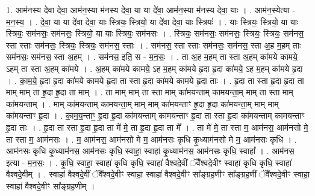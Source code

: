 \documentclass[17pt]{extarticle}
\begin{document}
1. आम॑नस्य देवा देवा॒ आम॑न॒स्या म॑नस्य देवा॒ या या दे॑वा॒ आम॑न॒स्या म॑नस्य देवा॒ याः । . आम॑न॒स्येत्या - म॒न॒स्य॒ । . दे॒वा॒ या या दे॑वा देवा॒ याः स्त्रियः॒ स्त्रियो॒ या दे॑वा देवा॒ याः स्त्रियः॑ । . याः स्त्रियः॒ स्त्रियो॒ या याः स्त्रियः॒ सम॑नसः॒ सम॑नसः॒ स्त्रियो॒ या याः स्त्रियः॒ सम॑नसः । . स्त्रियः॒ सम॑नसः॒ सम॑नसः॒ स्त्रियः॒ स्त्रियः॒ सम॑नस॒ स्ता स्ताः सम॑नसः॒ स्त्रियः॒ स्त्रियः॒ सम॑नस॒ स्ताः । . सम॑नस॒ स्ता स्ताः सम॑नसः॒ सम॑नस॒ स्ता अ॒ह म॒हम् ताः सम॑नसः॒ सम॑नस॒ स्ता अ॒हम् । . सम॑नस॒ इति॒ स - म॒न॒सः॒ । . ता अ॒ह म॒हम् ता स्ता अ॒हम् का॑मये कामये॒ ऽहम् ता स्ता अ॒हम् का॑मये । . अ॒हम् का॑मये कामये॒ ऽह म॒हम् का॑मये हृ॒दा हृ॒दा का॑मये॒ ऽह म॒हम् का॑मये हृ॒दा । . का॒म॒ये॒ हृ॒दा हृ॒दा का॑मये कामये हृ॒दा ता स्ता हृ॒दा का॑मये कामये हृ॒दा ताः । . हृ॒दा ता स्ता हृ॒दा हृ॒दा ता माम् माम् ता हृ॒दा हृ॒दा ता माम् । . ता माम् माम् ता स्ता माम् का॑मयन्ताम् कामयन्ता॒म् माम् ता स्ता माम् का॑मयन्ताम् । . माम् का॑मयन्ताम् कामयन्ता॒म् माम् माम् का॑मयन्ताꣳ हृ॒दा हृ॒दा का॑मयन्ता॒म् माम् माम् का॑मयन्ताꣳ हृ॒दा । . का॒म॒य॒न्ताꣳ॒॒ हृ॒दा हृ॒दा का॑मयन्ताम् कामयन्ताꣳ हृ॒दा ता स्ता हृ॒दा का॑मयन्ताम् कामयन्ताꣳ हृ॒दा ताः । . हृ॒दा ता स्ता हृ॒दा हृ॒दा ता मे॑ मे॒ ता हृ॒दा हृ॒दा ता मे᳚ । . ता मे॑ मे॒ ता स्ता म॒ आम॑नस॒ आम॑नसो मे॒ ता स्ता म॒ आम॑नसः । . म॒ आम॑नस॒ आम॑नसो मे म॒ आम॑नसः कृधि कृ॒ध्याम॑नसो मे म॒ आम॑नसः कृधि । . आम॑नसः कृधि कृ॒ध्याम॑नस॒ आम॑नसः कृधि॒ स्वाहा॒ स्वाहा॑ कृ॒ध्याम॑नस॒ आम॑नसः कृधि॒ स्वाहा᳚ । . आम॑नस॒ इत्या - म॒न॒सः॒ । . कृ॒धि॒ स्वाहा॒ स्वाहा॑ कृधि कृधि॒ स्वाहा॑ वैश्वदे॒वीं ॅवै᳚श्वदे॒वीꣳ स्वाहा॑ कृधि कृधि॒ स्वाहा॑ वैश्वदे॒वीम् । . स्वाहा॑ वैश्वदे॒वीं ॅवै᳚श्वदे॒वीꣳ स्वाहा॒ स्वाहा॑ वैश्वदे॒वीꣳ सा᳚ङ्ग्रह॒णीꣳ सा᳚ङ्ग्रह॒णीं ॅवै᳚श्वदे॒वीꣳ स्वाहा॒ स्वाहा॑ वैश्वदे॒वीꣳ सा᳚ङ्ग्रह॒णीम् । \newline
\end{document}

